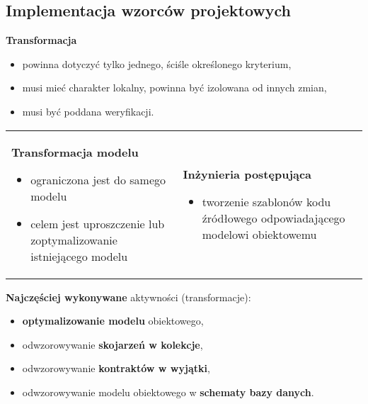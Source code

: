 \documentclass[a4paper]{article}
\begin{document}
    \subsection{Implementacja wzorców projektowych}

    \textbf{Transformacja}
    \begin{itemize}
        \item powinna dotyczyć tylko jednego, ściśle określonego kryterium,
        \item musi mieć charakter lokalny, powinna być izolowana od innych zmian,
        \item musi być poddana weryfikacji.
    \end{itemize}

    \begin{table}[H]
        \begin{center}
            \begin{tabular}{ p{8cm} p{8cm} }
                \item \textbf{Transformacja modelu}
                \begin{itemize}
                    \item ograniczona jest do samego modelu
                    \item celem jest uproszczenie lub zoptymalizowanie istniejącego modelu
                \end{itemize}
                &
                \item \textbf{Inżynieria postępująca}
                \begin{itemize}
                    \item tworzenie szablonów kodu źródłowego odpowiadającego modelowi obiektowemu
                \end{itemize}\\
            \end{tabular}
        \end{center}
    \end{table}

    \textbf{Najczęściej wykonywane} aktywności (transformacje):
    \begin{itemize}
        \item \textbf{optymalizowanie modelu} obiektowego,
        \item odwzorowywanie \textbf{skojarzeń w kolekcje},
        \item odwzorowywanie \textbf{kontraktów w wyjątki},
        \item odwzorowywanie modelu obiektowego w \textbf{schematy bazy danych}.
    \end{itemize}
\end{document}
